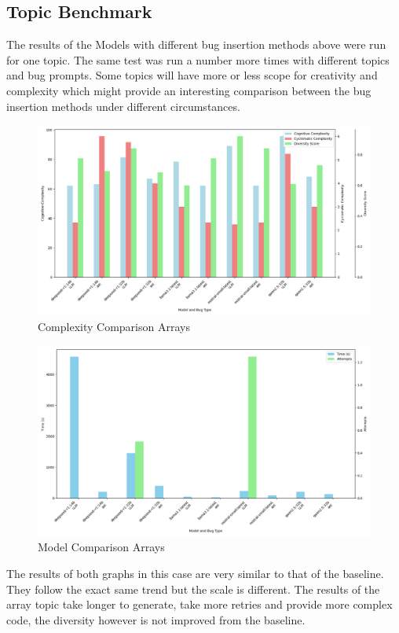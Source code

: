 \documentclass[12pt]{extarticle}
\begin{document}
\subsection{Topic Benchmark}

The results of the Models with different bug insertion methods above were run for one topic. The same test was run a number more times with different topics and bug prompts. Some topics will have more or less scope for creativity and complexity which might provide an interesting comparison between the bug insertion methods under different circumstances.

\begin{figure}[H]
\centering
\includegraphics[width=0.7\linewidth]{Images/Complexity_Comparison_Arrays.png}
\caption{Complexity Comparison Arrays}
\label{fig:Complexity_Comparison_Arrays}
\end{figure}
    

\begin{figure}[H]
\centering
\includegraphics[width=0.7\linewidth]{Images/Model_Comparison_Arrays.png}
\caption{Model Comparison Arrays}
\label{fig:Model_Comparison_Arrays}
\end{figure}

The results of both graphs in this case are very similar to that of the baseline. They follow the exact same trend but the scale is different. The results of the array topic take longer to generate, take more retries and provide more complex code, the diversity however is not improved from the baseline.
\end{document}
